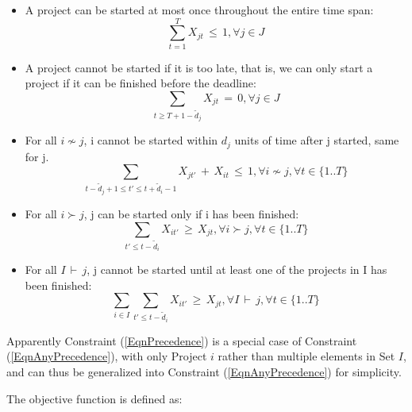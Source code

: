\documentclass[final,3p,times]{elsarticle}
\begin{document}
	\begin{itemize}
	
		\item A project can be started at most once throughout the entire time span:
		\begin{equation}
			\label{EqnConstraintStartOnlyOnce}
			\sum\limits_{t=1}^{T} X_{jt}\,\leq\,1,\forall j \in J
		\end{equation}
		
		\item A project cannot be started if it is too late, that is, we can only start a project if it can be finished before the deadline:
		\begin{equation}
			\sum\limits_{t\geq T+1-\tilde{d}_j} X_{jt}\,=\,0, \forall j \in J
		\end{equation}
		
		\item For all $i \nsim j$, i cannot be started within $d_j$ units of time after j started, same for j.
		\begin{equation}
			\sum\limits_{t-\tilde{d}_j+1\leq t'\leq t+\tilde{d}_i-1} X_{jt'}\,+\,X_{it}\,\leq\,1,\forall i \nsim j, \forall t \in \{1 .. T\}
		\end{equation}
		
		\item For all $i \succ j$, j can be started only if i has been finished:
		\begin{equation}
			\label{EqnPrecedence}
			\sum\limits_{t'\leq t-\tilde{d}_i} X_{it'} \,\geq\, X_{jt},\forall i\succ j, \forall t \in \{1 .. T\} 
		\end{equation}
		
		\item For all $I\,\vdash\,j$, j cannot be started until at least one of the projects in I has been finished:
		\begin{equation}
			\label{EqnAnyPrecedence}
			\sum\limits_{i\in I}\sum\limits_{t'\leq t-\tilde{d}_i} X_{it'}\,\geq\,X_{jt},\forall I\,\vdash\,j, \forall t \in \{1 .. T\}
		\end{equation}
	\end{itemize}

	Apparently Constraint (\ref{EqnPrecedence}) is a special case of Constraint (\ref{EqnAnyPrecedence}), with only Project $i$ rather than multiple elements in Set $I$, and can thus be generalized into Constraint (\ref{EqnAnyPrecedence}) for simplicity.
	
	The objective function is defined as:
\end{document}
